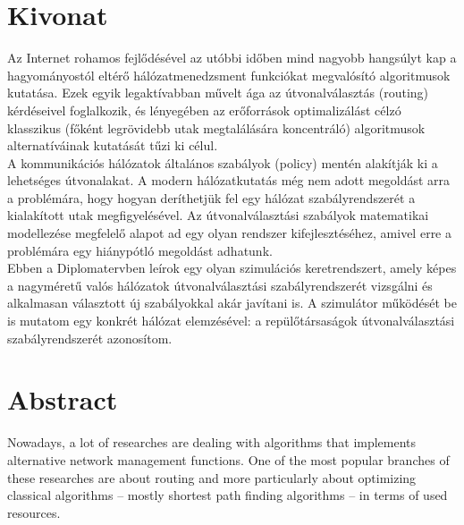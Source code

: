 \chapter*{Kivonat}
Az Internet rohamos fejlődésével az utóbbi időben mind nagyobb hangsúlyt kap a hagyományostól eltérő hálózatmenedzsment funkciókat megvalósító algoritmusok kutatása. Ezek egyik legaktívabban művelt ága az útvonalválasztás (routing) kérdéseivel foglalkozik, és lényegében az erőforrások optimalizálást célzó klasszikus (főként legrövidebb utak megtalálására koncentráló) algoritmusok alternatíváinak kutatását tűzi ki célul.\\

A kommunikációs hálózatok általános szabályok (policy) mentén alakítják ki a lehetséges útvonalakat. A modern hálózatkutatás még nem adott megoldást arra a problémára, hogy hogyan deríthetjük fel egy hálózat szabályrendszerét a kialakított utak megfigyelésével. Az útvonalválasztási szabályok matematikai modellezése megfelelő alapot ad\cite{Compact_Policy_Routing} egy olyan rendszer kifejlesztéséhez, amivel erre a problémára egy hiánypótló megoldást adhatunk.\\

Ebben a Diplomatervben leírok egy olyan szimulációs keretrendszert, amely képes a nagyméretű valós hálózatok útvonalválasztási szabályrendszerét vizsgálni és alkalmasan választott új szabályokkal akár javítani is. A szimulátor működését be is mutatom egy konkrét hálózat elemzésével: a repülőtársaságok útvonalválasztási szabályrendszerét azonosítom.

\vfill

\chapter*{Abstract}
Nowadays, a lot of researches are dealing with algorithms that implements alternative network management functions. One of the most popular branches of these researches are about routing and more particularly about optimizing classical algorithms -- mostly shortest path finding algorithms -- in terms of used resources.\\

